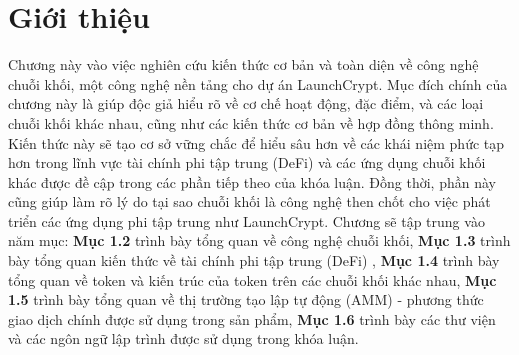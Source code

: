 \setlength{\parindent}{1cm}

\section{Giới thiệu}

\hspace{1cm}
Chương này vào việc nghiên cứu kiến thức cơ bản và toàn diện về
công nghệ chuỗi khối, một công nghệ nền tảng cho dự án LaunchCrypt. Mục đích chính
của chương này là giúp độc giả hiểu rõ về cơ chế hoạt động, đặc điểm, và các loại
chuỗi khối khác nhau, cũng như các kiến thức cơ bản về hợp đồng thông minh. Kiến thức
này sẽ tạo cơ sở vững chắc để hiểu sâu hơn về các khái niệm phức tạp hơn trong
lĩnh vực tài chính phi tập trung (DeFi) và các ứng dụng chuỗi khối khác được đề
cập trong các phần tiếp theo của khóa luận. Đồng thời, phần này cũng giúp làm rõ
lý do tại sao chuỗi khối là công nghệ then chốt cho việc phát triển các ứng dụng
phi tập trung như LaunchCrypt. Chương sẽ tập trung vào năm mục: \textbf{Mục
  1.2} trình bày tổng quan về công nghệ chuỗi khối, \textbf{Mục 1.3} trình bày tổng quan kiến
thức về tài chính phi tập trung (DeFi) , \textbf{Mục 1.4} trình bày tổng quan về
token và kiến trúc của token trên các chuỗi khối khác nhau, \textbf{Mục 1.5} trình bày
tổng quan về thị trường tạo lập tự động (AMM) - phương thức giao dịch chính
được sử dụng trong sản phẩm, \textbf{Mục 1.6} trình bày các thư viện và các
ngôn ngữ lập trình được sử dụng trong khóa luận.
